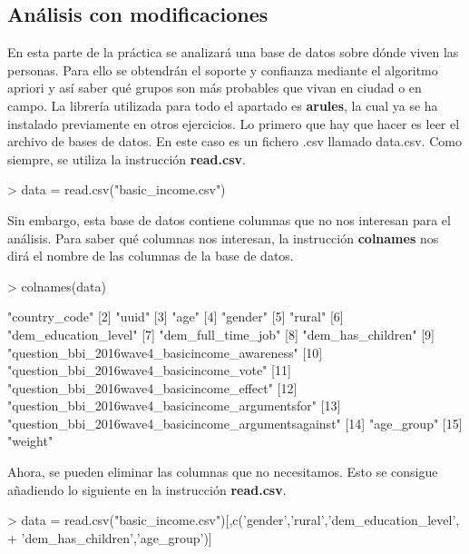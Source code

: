 \documentclass [a4paper] {article}
\begin{document}
\subsection{Análisis con modificaciones}
En esta parte de la práctica se analizará una base de datos sobre dónde viven las personas. Para ello se
obtendrán el soporte y confianza mediante el algoritmo apriori y así saber qué grupos son más probables que 
vivan en ciudad o en campo. 
La librería utilizada para todo el apartado es \textbf{arules}, la cual ya se ha instalado previamente en otros 
ejercicios.
Lo primero que hay que hacer es leer el archivo de bases de datos. En este caso es un fichero .csv llamado 
data.csv. Como siempre, se utiliza la instrucción \textbf{read.csv}. 
\begin{Schunk}
\begin{Sinput}
> data = read.csv("basic_income.csv")
\end{Sinput}
\end{Schunk}
Sin embargo, esta base de datos contiene columnas que no nos interesan para el análisis. 
Para saber qué columnas nos interesan, la instrucción \textbf{colnames} nos dirá el nombre de las columnas 
de la base de datos. 
\begin{Schunk}
\begin{Sinput}
> colnames(data)
\end{Sinput}
\begin{Soutput}
 [1] "country_code"                                       
 [2] "uuid"                                               
 [3] "age"                                                
 [4] "gender"                                             
 [5] "rural"                                              
 [6] "dem_education_level"                                
 [7] "dem_full_time_job"                                  
 [8] "dem_has_children"                                   
 [9] "question_bbi_2016wave4_basicincome_awareness"       
[10] "question_bbi_2016wave4_basicincome_vote"            
[11] "question_bbi_2016wave4_basicincome_effect"          
[12] "question_bbi_2016wave4_basicincome_argumentsfor"    
[13] "question_bbi_2016wave4_basicincome_argumentsagainst"
[14] "age_group"                                          
[15] "weight"                                             
\end{Soutput}
\end{Schunk}
Ahora, se pueden eliminar las columnas que no necesitamos. Esto se consigue añadiendo lo siguiente
en la instrucción \textbf{read.csv}.
\begin{Schunk}
\begin{Sinput}
> data = read.csv("basic_income.csv")[,c('gender','rural','dem_education_level',
+ 'dem_has_children','age_group')]
\end{Sinput}
\end{Schunk}
\end{document}
